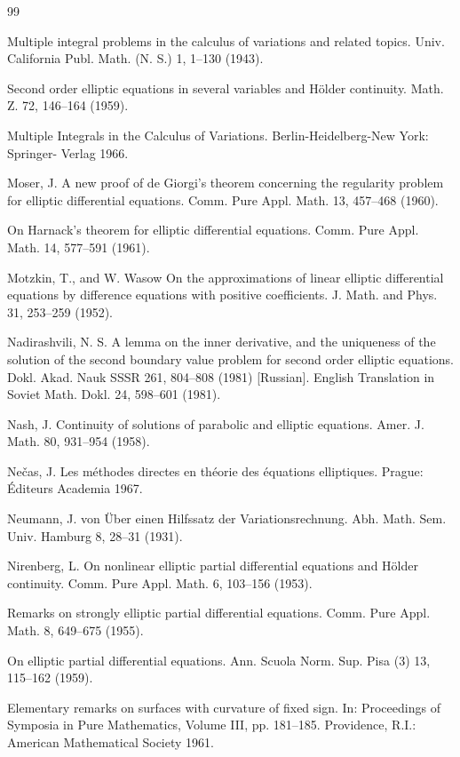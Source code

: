 \begin{thebibliography}{99}

Multiple integral problems in the calculus of variations and related topics. Univ. California
Publ. Math. (N. S.) 1, 1--130 (1943).

Second order elliptic equations in several variables and Hölder continuity. Math. Z. 72,
146--164 (1959).

Multiple Integrals in the Calculus of Variations. Berlin-Heidelberg-New York: Springer-
Verlag 1966.

Moser, J.
A new proof of de Giorgi's theorem concerning the regularity problem for elliptic differential
equations. Comm. Pure Appl. Math. 13, 457--468 (1960).

On Harnack's theorem for elliptic differential equations. Comm. Pure Appl. Math. 14,
577--591 (1961).

Motzkin, T., and W. Wasow
On the approximations of linear elliptic differential equations by difference equations with
positive coefficients. J. Math. and Phys. 31, 253--259 (1952).

Nadirashvili, N. S.
A lemma on the inner derivative, and the uniqueness of the solution of the second boundary
value problem for second order elliptic equations. Dokl. Akad. Nauk SSSR 261, 804--808
(1981) [Russian]. English Translation in Soviet Math. Dokl. 24, 598--601 (1981).

Nash, J.
Continuity of solutions of parabolic and elliptic equations. Amer. J. Math. 80, 931--954
(1958).

Nečas, J.
Les méthodes directes en théorie des équations elliptiques. Prague: Éditeurs Academia 1967.

Neumann, J. von
Über einen Hilfssatz der Variationsrechnung. Abh. Math. Sem. Univ. Hamburg 8, 28--31
(1931).

Nirenberg, L.
On nonlinear elliptic partial differential equations and Hölder continuity. Comm. Pure
Appl. Math. 6, 103--156 (1953).

Remarks on strongly elliptic partial differential equations. Comm. Pure Appl. Math. 8,
649--675 (1955).

On elliptic partial differential equations. Ann. Scuola Norm. Sup. Pisa (3) 13, 115--162
(1959).

Elementary remarks on surfaces with curvature of fixed sign. In: Proceedings of Symposia
in Pure Mathematics, Volume III, pp. 181--185. Providence, R.I.: American Mathematical
Society 1961.


\end{thebibliography}
